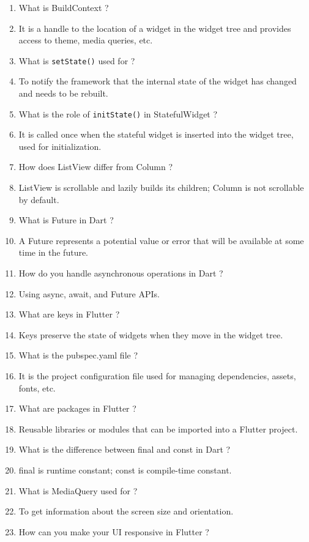 \documentclass{article}
\def \answer{\item[$\rightarrow$]}
\begin{document}
\begin{enumerate}
		\\
		\item  What is BuildContext ?
		\answer It is a handle to the location of a widget in the widget tree and provides access to theme, media queries, etc.
		\\
		\item  What is \texttt{setState()} used for ?
		\answer To notify the framework that the internal state of the widget has changed and needs to be rebuilt.
		\\
		\item  What is the role of \texttt{initState()} in StatefulWidget ?
		\answer It is called once when the stateful widget is inserted into the widget tree, used for initialization.
		\\
		\item  How does ListView differ from Column ?
		\answer ListView is scrollable and lazily builds its children; Column is not scrollable by default.
		\\
		\item  What is Future in Dart ?
		\answer A Future represents a potential value or error that will be available at some time in the future.
		\\
		\item  How do you handle asynchronous operations in Dart ?
		\answer Using async, await, and Future APIs.
		\\
		\item  What are keys in Flutter ?
		\answer Keys preserve the state of widgets when they move in the widget tree.
		\\
		\item  What is the pubspec.yaml file ?
		\answer It is the project configuration file used for managing dependencies, assets, fonts, etc.
		\\
		\item  What are packages in Flutter ?
		\answer Reusable libraries or modules that can be imported into a Flutter project.
		\\
		\item  What is the difference between final and const in Dart ?
		\answer final is runtime constant; const is compile-time constant.
		\\
		\item  What is MediaQuery used for ?
		\answer To get information about the screen size and orientation.
		\\
		\item  How can you make your UI responsive in Flutter ?

\end{enumerate}
\end{document}
